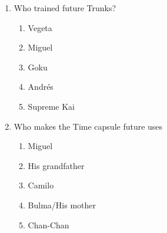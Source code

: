 \documentclass[letterpaper,addpoints,answers,twocolumn,10pt]{exam}
\begin{document}
\begin{enumerate}[leftmargin=.2in]
\begin{enumerate}[noitemsep,leftmargin=0in]
\end{enumerate}



\item  Who trained future Trunks?


\begin{enumerate}[noitemsep,leftmargin=0in]


\item  Vegeta
\item  Miguel
\item  Goku
\item  Andrés
\item  Supreme Kai


\end{enumerate}



\item  Who makes the Time capsule future uses


\begin{enumerate}[noitemsep,leftmargin=0in]


\item  Miguel
\item  His grandfather
\item  Camilo
\item  Bulma/His mother
\item  Chan-Chan


\end{enumerate}



\end{enumerate}
\end{document}
